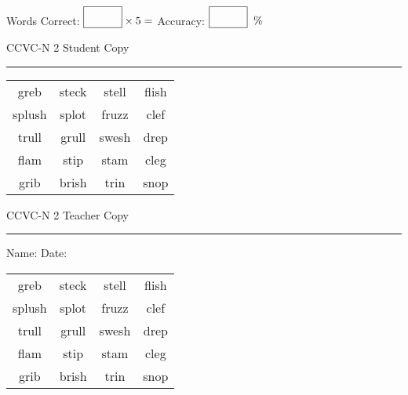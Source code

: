 \documentclass{memoir}
\begin{document}
\small

Words Correct: $\fbox{\phantom{\huge 100}} \times 5 = $ Accuracy: $\fbox{\phantom{\huge 100}}\;\; \%$ 

\vfill

\newpage


\footnotesize \noindent
CCVC-N 2 \hfill Student Copy
\smallskip
\hrule

\Large

\setlength{\tabcolsep}{14pt}
\def\arraystretch{3}

{\selectfont


\begin{vplace}[0.5]
\begin{center}
\begin{tabular}{cccc}
greb & steck & stell & flish             \\
splush & splot & fruzz & clef             \\
trull & grull            & swesh & drep \\
flam             & stip & stam            & cleg \\
grib     & brish & trin & snop \\
\end{tabular}
\end{center}
\end{vplace}

}

\newpage

\footnotesize \noindent
CCVC-N 2 \hfill Teacher Copy
\smallskip
\hrule

\small

\vfill

\noindent
Name: \underline{\hspace{1.75in}} \hfill Date: \underline{\hspace{1in}}

\Large

{\selectfont


\begin{vplace}[0.5]
\begin{center}
\begin{tabular}{cccc}
greb & steck & stell & flish             \\
splush & splot & fruzz & clef             \\
trull & grull            & swesh & drep \\
flam             & stip & stam            & cleg \\
grib     & brish & trin & snop \\
\end{tabular}
\end{center}
\end{vplace}



}
\end{document}

